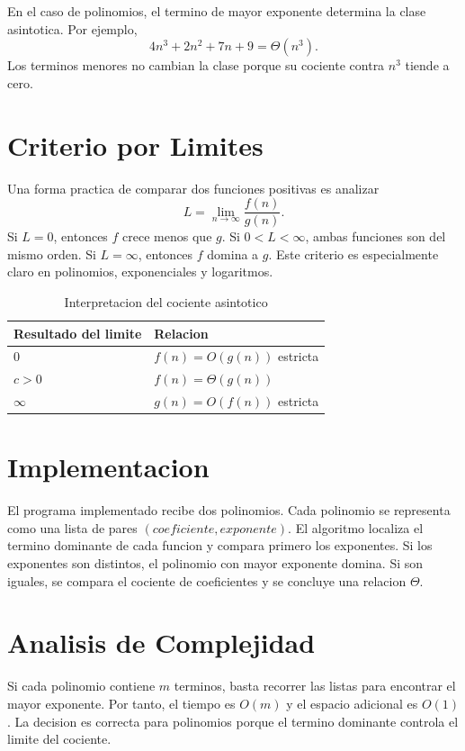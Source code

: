\documentclass[conference]{IEEEtran}
\begin{document}
En el caso de polinomios, el termino de mayor exponente determina la clase
asintotica. Por ejemplo,
\begin{equation}
4n^3+2n^2+7n+9=\Theta(n^3).
\end{equation}
Los terminos menores no cambian la clase porque su cociente contra $n^3$
tiende a cero.

\section{Criterio por Limites}
Una forma practica de comparar dos funciones positivas es analizar
\begin{equation}
L=\lim_{n\to\infty}\frac{f(n)}{g(n)}.
\end{equation}
Si $L=0$, entonces $f$ crece menos que $g$. Si $0<L<\infty$, ambas funciones
son del mismo orden. Si $L=\infty$, entonces $f$ domina a $g$. Este criterio
es especialmente claro en polinomios, exponenciales y logaritmos.

\begin{table}[htbp]
\caption{Interpretacion del cociente asintotico}
\centering
\begin{tabular}{ll}
\toprule
Resultado del limite & Relacion \\
\midrule
$0$ & $f(n)=O(g(n))$ estricta \\
$c>0$ & $f(n)=\Theta(g(n))$ \\
$\infty$ & $g(n)=O(f(n))$ estricta \\
\bottomrule
\end{tabular}
\end{table}

\section{Implementacion}
El programa implementado recibe dos polinomios. Cada polinomio se representa
como una lista de pares $(coeficiente, exponente)$. El algoritmo localiza el
termino dominante de cada funcion y compara primero los exponentes. Si los
exponentes son distintos, el polinomio con mayor exponente domina. Si son
iguales, se compara el cociente de coeficientes y se concluye una relacion
$\Theta$.

\section{Analisis de Complejidad}
Si cada polinomio contiene $m$ terminos, basta recorrer las listas para
encontrar el mayor exponente. Por tanto, el tiempo es $O(m)$ y el espacio
adicional es $O(1)$. La decision es correcta para polinomios porque el termino
dominante controla el limite del cociente.
\end{document}
